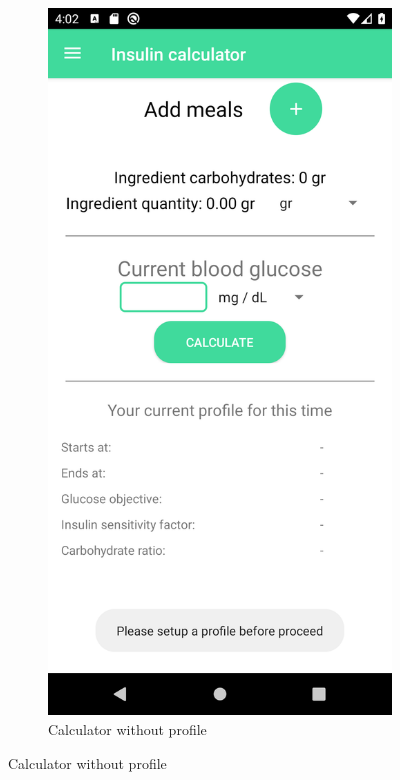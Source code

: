 \begin{figure}[H]
\begin{center}
        \begin{subfigure}{.3\textwidth}
            \includegraphics[scale=0.1, width=\textwidth]{_figures/calc_without_profile.png}
            \caption{Calculator without profile} 
        \end{subfigure}%
    \end{center}
\end{figure}

